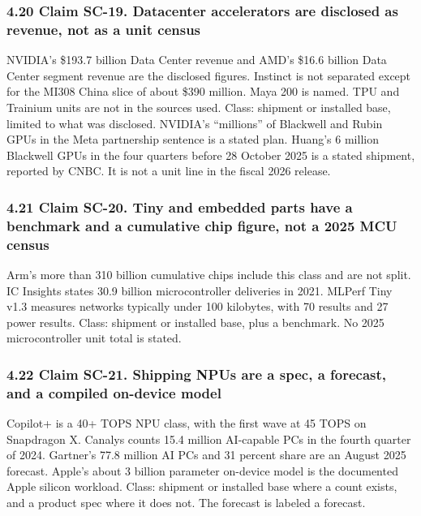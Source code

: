 \documentclass[
  10pt,
]{article}
\begin{document}
\subsubsection{4.20 Claim SC-19. Datacenter accelerators are disclosed
as revenue, not as a unit
census}\label{claim-sc-19.-datacenter-accelerators-are-disclosed-as-revenue-not-as-a-unit-census}

NVIDIA's \$193.7 billion Data Center revenue and AMD's \$16.6 billion
Data Center segment revenue are the disclosed figures. Instinct is not
separated except for the MI308 China slice of about \$390 million. Maya
200 is named. TPU and Trainium units are not in the sources used. Class:
shipment or installed base, limited to what was disclosed. NVIDIA's
``millions'' of Blackwell and Rubin GPUs in the Meta partnership
sentence is a stated plan. Huang's 6 million Blackwell GPUs in the four
quarters before 28 October 2025 is a stated shipment, reported by CNBC.
It is not a unit line in the fiscal 2026 release.

\subsubsection{4.21 Claim SC-20. Tiny and embedded parts have a
benchmark and a cumulative chip figure, not a 2025 MCU
census}\label{claim-sc-20.-tiny-and-embedded-parts-have-a-benchmark-and-a-cumulative-chip-figure-not-a-2025-mcu-census}

Arm's more than 310 billion cumulative chips include this class and are
not split. IC Insights states 30.9 billion microcontroller deliveries in
2021. MLPerf Tiny v1.3 measures networks typically under 100 kilobytes,
with 70 results and 27 power results. Class: shipment or installed base,
plus a benchmark. No 2025 microcontroller unit total is stated.

\subsubsection{4.22 Claim SC-21. Shipping NPUs are a spec, a forecast,
and a compiled on-device
model}\label{claim-sc-21.-shipping-npus-are-a-spec-a-forecast-and-a-compiled-on-device-model}

Copilot+ is a 40+ TOPS NPU class, with the first wave at 45 TOPS on
Snapdragon X. Canalys counts 15.4 million AI-capable PCs in the fourth
quarter of 2024. Gartner's 77.8 million AI PCs and 31 percent share are
an August 2025 forecast. Apple's about 3 billion parameter on-device
model is the documented Apple silicon workload. Class: shipment or
installed base where a count exists, and a product spec where it does
not. The forecast is labeled a forecast.
\end{document}

